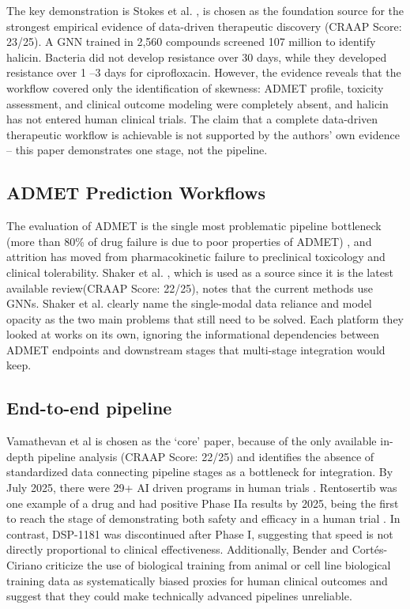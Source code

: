 \documentclass[conference]{IEEEtran}
\begin{document}
 The key demonstration is Stokes et al. \cite{b11}, is chosen as the foundation source for the strongest empirical evidence of data-driven therapeutic discovery (CRAAP Score: 23/25). A GNN trained in 2,560 compounds screened 107 million to identify halicin. Bacteria did not develop resistance over 30 days, while they developed resistance over 1 –3 days for ciprofloxacin. However, the evidence reveals that the workflow covered only the identification of skewness: ADMET profile, toxicity assessment, and clinical outcome modeling were completely absent, and halicin has not entered human clinical trials. The claim that a complete data-driven therapeutic workflow is achievable is not supported by the authors' own evidence -- this paper demonstrates one stage, not the pipeline.

\subsection{ADMET Prediction Workflows}
The evaluation of ADMET is the single most problematic pipeline bottleneck (more than 80\% of drug failure is due to poor properties of ADMET) \cite{b8}, and attrition has moved from pharmacokinetic failure to preclinical toxicology and clinical tolerability. Shaker et al. \cite{b7}, which is used as a source since it is the latest available review(CRAAP Score: 22/25), notes that the current methods use GNNs. Shaker et al. \cite{b7} clearly name the single-modal data reliance and model opacity as the two main problems that still need to be solved. Each platform they looked at works on its own, ignoring the informational dependencies between ADMET endpoints and downstream stages that multi-stage integration would keep.

\subsection{End-to-end pipeline}
Vamathevan et al \cite{b3} is chosen as the `core' paper, because of the only available in-depth pipeline analysis (CRAAP Score: 22/25) and identifies the absence of standardized data connecting pipeline stages as a bottleneck for integration. By July 2025, there were 29+ AI driven programs in human trials \cite{b2}. Rentosertib was one example of a drug and had positive Phase IIa results by 2025, being the first to reach the stage of demonstrating both safety and efficacy in a human trial \cite{b2}. In contrast, DSP-1181 was discontinued after Phase I, suggesting that speed is not directly proportional to clinical effectiveness. Additionally, Bender and Cort\'{e}s-Ciriano \cite{b9} criticize the use of biological training from animal or cell line biological training data as systematically biased proxies for human clinical outcomes and suggest that they could make technically advanced pipelines unreliable.
\end{document}
